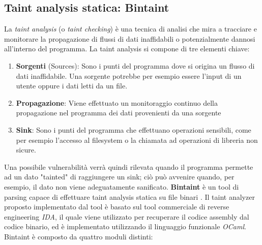 \documentclass[../main.tex]{subfiles}
\begin{document}
\subsection{Taint analysis statica: Bintaint}
La \textit{taint analysis} (o \textit{taint checking}) è una tecnica di analisi che mira a tracciare e monitorare la propagazione di flussi di dati inaffidabili o 
potenzialmente dannosi all'interno del programma. La taint analysis si compone di tre elementi chiave:
\begin{enumerate}
    \item \textbf{Sorgenti} (Sources): Sono i punti del programma dove si origina un flusso di dati inaffidabile. Una sorgente potrebbe per esempio essere l'input di un utente oppure i dati
    letti da un file.
    \item \textbf{Propagazione}: Viene effettuato un monitoraggio continuo della propagazione nel programma dei dati provenienti da una sorgente
    \item \textbf{Sink}: Sono i punti del programma che effettuano operazioni sensibili, come per esempio l'accesso al filesystem o la chiamata ad operazioni di libreria non sicure. 
\end{enumerate}
Una possibile vulnerabilità verrà quindi rilevata quando il programma permette ad un dato "tainted" di raggiungere un sink; ciò può avvenire quando, per esempio, il dato
non viene adeguatamente sanificato.
\newline
\textbf{Bintaint} è un tool di parsing capace di effettuare taint analysis statica su file binari  \cite{Bintaint}.
Il taint analyzer proposto implementato dal tool è basato sul tool commerciale di reverse engineering \textit{IDA}, il quale viene utilizzato per recuperare il codice assembly dal codice binario, 
ed è implementato utilizzando il linguaggio funzionale \textit{OCaml}.
Bintaint è composto da quattro moduli distinti:
\end{document}
